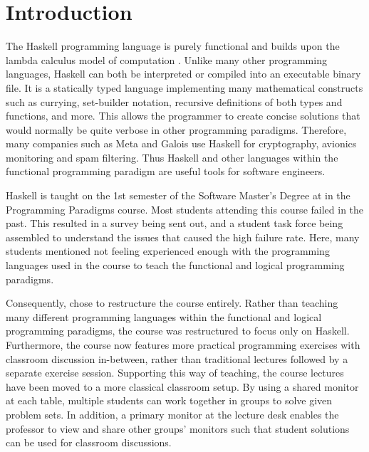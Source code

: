 \chapter{Introduction} \label{chap:introduction}
The Haskell programming language is purely functional\cite{} and builds upon the lambda calculus model of computation \cite{}.
Unlike many other programming languages, Haskell can both be interpreted or compiled into an executable binary file.
It is a statically typed language implementing many mathematical constructs such as currying, set-builder notation, recursive definitions of both types and functions, and more.
This allows the programmer to create concise solutions that would normally be quite verbose in other programming paradigms.
Therefore, many companies such as Meta and Galois use Haskell for cryptography, avionics monitoring and spam filtering.
Thus Haskell and other languages within the functional programming paradigm are useful tools for software engineers.


Haskell is taught on the 1st semester of the Software Master's Degree at \aau{} in the Programming Paradigms course.
Most students attending this course failed in the past.
This resulted in a survey being sent out, and a student task force being assembled to understand the issues that caused the high failure rate.
Here, many students mentioned not feeling experienced enough with the programming languages used in the course to teach the functional and logical programming paradigms.


Consequently, \aau{} chose to restructure the course entirely.
Rather than teaching many different programming languages within the functional and logical programming paradigms, the course was restructured to focus only on Haskell.
Furthermore, the course now features more practical programming exercises with classroom discussion in-between, rather than traditional lectures followed by a separate exercise session.
Supporting this way of teaching, the course lectures have been moved to a more classical classroom setup.
By using a shared monitor at each table, multiple students can work together in groups to solve given problem sets.
In addition, a primary monitor at the lecture desk enables the professor to view and share other groups' monitors such that student solutions can be used for classroom discussions.


